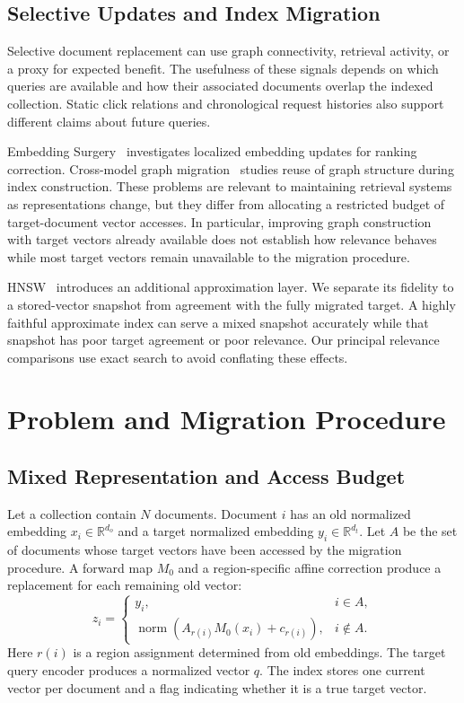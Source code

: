 \documentclass[runningheads]{llncs}
\begin{document}
\subsection{Selective Updates and Index Migration}

Selective document replacement can use graph connectivity, retrieval activity, or a proxy for expected benefit. The usefulness of these signals depends on which queries are available and how their associated documents overlap the indexed collection. Static click relations and chronological request histories also support different claims about future queries.

Embedding Surgery~\cite{surgery} investigates localized embedding updates for ranking correction. Cross-model graph migration~\cite{graphmigration} studies reuse of graph structure during index construction. These problems are relevant to maintaining retrieval systems as representations change, but they differ from allocating a restricted budget of target-document vector accesses. In particular, improving graph construction with target vectors already available does not establish how relevance behaves while most target vectors remain unavailable to the migration procedure.

HNSW~\cite{hnsw} introduces an additional approximation layer. We separate its fidelity to a stored-vector snapshot from agreement with the fully migrated target. A highly faithful approximate index can serve a mixed snapshot accurately while that snapshot has poor target agreement or poor relevance. Our principal relevance comparisons use exact search to avoid conflating these effects.

\section{Problem and Migration Procedure}

\subsection{Mixed Representation and Access Budget}

Let a collection contain $N$ documents. Document $i$ has an old normalized embedding $x_i\in\mathbb{R}^{d_o}$ and a target normalized embedding $y_i\in\mathbb{R}^{d_t}$. Let $A$ be the set of documents whose target vectors have been accessed by the migration procedure. A forward map $M_0$ and a region-specific affine correction produce a replacement for each remaining old vector:
\begin{equation}
 z_i=\begin{cases}
 y_i, & i\in A,\\
 \operatorname{norm}(A_{r(i)}M_0(x_i)+c_{r(i)}), & i\notin A.
 \end{cases}
 \label{eq:mixed}
\end{equation}
Here $r(i)$ is a region assignment determined from old embeddings. The target query encoder produces a normalized vector $q$. The index stores one current vector per document and a flag indicating whether it is a true target vector.
\end{document}
